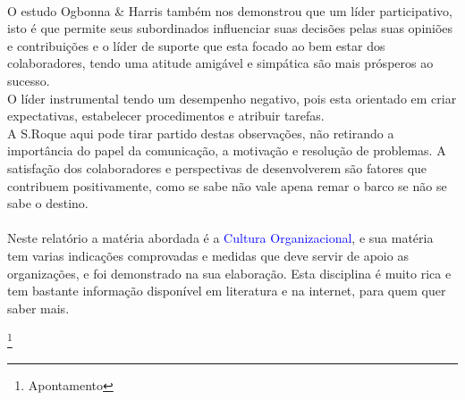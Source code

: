 \\
O estudo Ogbonna \& Harris também nos demonstrou que um líder participativo, isto é que permite seus subordinados influenciar suas decisões pelas suas opiniões e contribuições e o líder de suporte que esta focado ao bem estar dos colaboradores, tendo uma atitude amigável e simpática são mais prósperos ao sucesso.\\
O líder instrumental tendo um desempenho negativo, pois esta orientado em criar expectativas, estabelecer procedimentos e atribuir tarefas.\\
A S.Roque aqui pode tirar partido destas observações, não retirando a importância do papel da comunicação, a motivação e resolução de problemas.
A satisfação dos colaboradores e perspectivas de desenvolverem são fatores que contribuem positivamente, como se sabe não vale apena remar o barco se não se sabe o destino.\\
\\
Neste relatório a matéria abordada é a \textcolor{blue}{Cultura Organizacional}, e sua matéria tem varias indicações comprovadas e medidas que deve servir de apoio as organizações, e foi demonstrado na sua elaboração. Esta disciplina é muito rica e tem bastante informação disponível em literatura e na internet, para quem quer saber mais.
\newpage
%
%
\listoffigures
\cite{*}

\newpage
\footnote{Apontamento}

